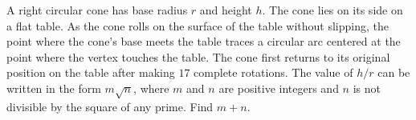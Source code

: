 A right circular cone has base radius $ r$ and height $ h$.  The cone lies on its side on a flat table.  As the cone rolls on the surface of the table without slipping, the point where the cone's base meets the table traces a circular arc centered  at the point where the vertex touches the table.  The cone first returns to its original position on the table after making $ 17$ complete rotations.  The value of $ h/r$ can be written in the form $ m\sqrt {n}$, where $ m$ and $ n$ are positive integers and $ n$ is not divisible by the square of any prime.  Find $ m + n$.